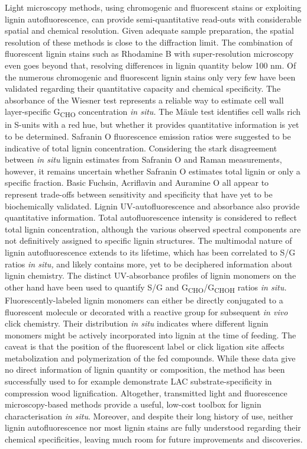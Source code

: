 \documentclass[journal=,manuscript=]{achemso}
\begin{document}
Light microscopy methods, using chromogenic and fluorescent stains or
exploiting lignin autofluorescence, can provide semi-quantitative
read-outs with considerable spatial and chemical resolution. Given
adequate sample preparation, the spatial resolution of these methods is
close to the diffraction limit. The combination of fluorescent lignin
stains such as Rhodamine B with super-resolution microscopy even goes
beyond that, resolving differences in lignin quantity below 100
nm.\citep{Donaldson2022} Of the numerous chromogenic and fluorescent
lignin stains only very few have been validated regarding their
quantitative capacity and chemical specificity. The absorbance of the
Wiesner test represents a reliable way to estimate cell wall
layer-specific G\textsubscript{CHO} concentration \emph{in
situ.}\citep{Blaschek2020a} The Mäule test identifies cell walls rich in
S-units with a red hue, but whether it provides quantitative information
is yet to be determined.\citep{Yamashita2016} Safranin O fluorescence
emission ratios were suggested to be indicative of total lignin
concentration.\citep{Baldacci-Cresp2020} Considering the stark
disagreement between \emph{in situ} lignin estimates from Safranin O and
Raman measurements, however, it remains uncertain whether Safranin O
estimates total lignin or only a specific
fraction.\citep{Blaschek2023, Baldacci-Cresp2020} Basic Fuchsin,
Acriflavin and Auramine O all appear to represent trade-offs between
sensitivity and specificity that have yet to be biochemically
validated.\citep{Ursache2018} Lignin UV-autofluorescence and absorbance
also provide quantitative information. Total autofluorescence intensity
is considered to reflect total lignin concentration, although the
various observed spectral components are not definitively assigned to
specific lignin structures.\citep{Decou2019} The multimodal nature of
lignin autofluorescence extends to its lifetime, which has been
correlated to S/G ratios \emph{in situ,}\citep{Escamez2021} and likely
contains more, yet to be deciphered information about lignin chemistry.
The distinct UV-absorbance profiles of lignin monomers on the other hand
have been used to quantify S/G and
G\textsubscript{CHO}/G\textsubscript{CHOH} ratios \emph{in
situ.}\citep{Peng1997, Yoshida2005} Fluorescently-labeled lignin
monomers can either be directly conjugated to a fluorescent molecule or
decorated with a reactive group for subsequent \emph{in vivo} click
chemistry. Their distribution \emph{in situ} indicates where different
lignin monomers might be actively incorporated into lignin at the time
of feeding. The caveat is that the position of the fluorescent label or
click ligation site affects metabolization and polymerization of the fed
compounds. While these data give no direct information of lignin
quantity or composition, the method has been successfully used to for
example demonstrate LAC substrate-specificity in compression wood
lignification.\citep{Hiraide2021} Altogether, transmitted light and
fluorescence microscopy-based methods provide a useful, low-cost toolbox
for lignin characterisation \emph{in situ}. Moreover, and despite their
long history of use, neither lignin autofluorescence nor most lignin
stains are fully understood regarding their chemical specificities,
leaving much room for future improvements and discoveries.
\end{document}
